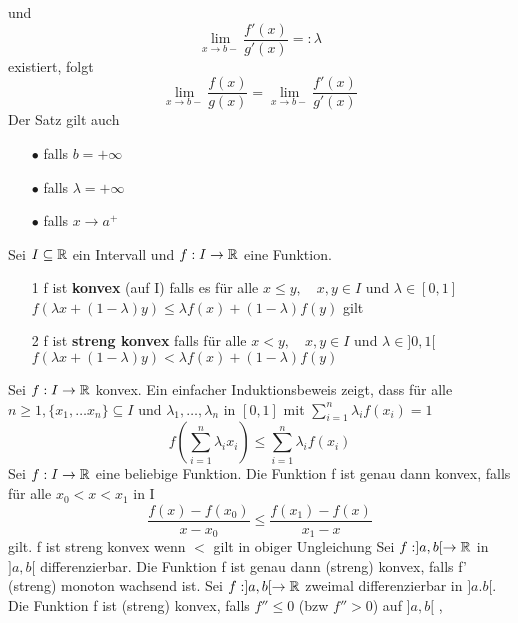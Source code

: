 und
\[ \lim\limits_{x \rightarrow b-} \frac{f'(x)}{g'(x)} =: \lambda\]
existiert, folgt
\[ \lim\limits_{x \rightarrow b-} \frac{f(x)}{g(x)} = \lim\limits_{x \rightarrow b-} \frac{f'(x)}{g'(x)}\]
 Der Satz gilt auch 
\begin{enumerate}
    \item [$\bullet$] falls \(b = + \infty\)
    \item [$\bullet$] falls \( \lambda = + \infty\)
    \item [$\bullet$] falls \( x \rightarrow a^{+}\)
\end{enumerate}
 Sei \(I \subseteq \mathbb{R} \) ein Intervall und \(f: I \rightarrow \mathbb{R} \) eine Funktion.
\begin{enumerate}
    \item [1] f ist \textbf{konvex} (auf I) falls es für alle \(x \leq y, \quad x,y \in I \) und \(\lambda \in [0,1]\)
    \(f(\lambda x + (1 - \lambda)y) \leq \lambda f(x) + (1 - \lambda) f(y)\) gilt
    \item [2] f ist \textbf{streng konvex} falls für alle \(x < y, \quad x,y \in I \) und \( \lambda \in ]0,1[\)
    \(f(\lambda x + (1 - \lambda)y) < \lambda f(x) + (1 - \lambda)f(y)\)
\end{enumerate}
 Sei \(f : I \rightarrow \mathbb{R} \) konvex. Ein einfacher Induktionsbeweis zeigt, dass für alle \(n \geq 1, \{x_1, \dots x_n \} \subseteq I \) und \(\lambda_1, \dots, \lambda_n\) in \([0,1]\) mit \(\sum_{i=1}^n \lambda_i f(x_i) = 1\)
\[f(\sum_{i=1}^n \lambda_i x_i) \leq \sum_{i=1}^n \lambda_i f(x_i)\]
 Sei \(f : I \rightarrow \mathbb{R} \) eine beliebige Funktion. Die Funktion f ist genau dann konvex, falls für alle \(x_0 < x < x_1 \) in I
\[ \frac{f(x) - f(x_0)}{x - x_0} \leq \frac{f(x_1) - f(x)}{x_1 - x}\]
gilt. f ist streng konvex wenn \( < \) gilt in obiger Ungleichung
 Sei \(f : ]a,b[ \rightarrow \mathbb{R} \) in \(]a,b[\) differenzierbar. Die Funktion f ist genau dann (streng) konvex, falls f' (streng) monoton wachsend ist.
 Sei \(f : ]a,b[ \rightarrow \mathbb{R} \) zweimal differenzierbar in \(]a.b[\). Die Funktion f ist (streng) konvex, falls \(f'' \leq 0\) (bzw \(f'' > 0\)) auf \(]a,b[\)
\sep
